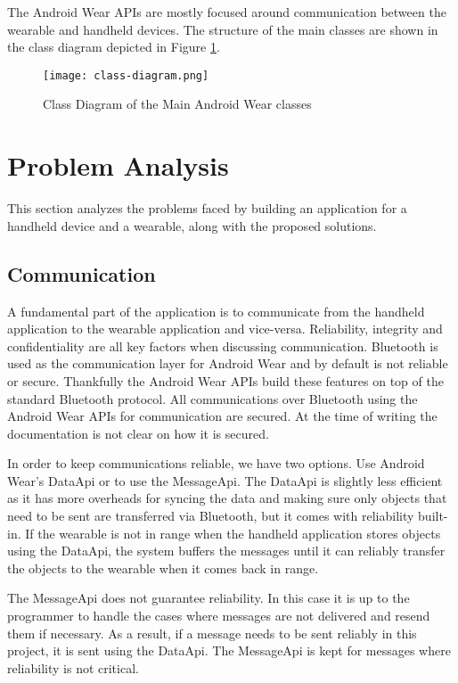 The Android Wear APIs are mostly focused around communication between the
wearable and handheld devices. The structure of the main classes are shown in
the class diagram depicted in Figure \ref{fig:android_wear_class_diagram}.

\begin{figure}
    \centering
    \texttt{[image: class-diagram.png]}
    \caption{Class Diagram of the Main Android Wear classes}
    \label{fig:android_wear_class_diagram}
\end{figure}

\section{Problem Analysis}

This section analyzes the problems faced by building an application for a
handheld device and a wearable, along with the proposed solutions.

\subsection{Communication}

A fundamental part of the application is to communicate from the handheld
application to the wearable application and vice-versa. Reliability, integrity
and confidentiality are all key factors when discussing communication. Bluetooth
is used as the communication layer for Android Wear and by default is not
reliable or secure. Thankfully the Android Wear APIs build these features on top
of the standard Bluetooth protocol. All communications over Bluetooth using the
Android Wear APIs for communication are secured. At the time of writing the
documentation is not clear on how it is secured.

In order to keep communications reliable, we have two options. Use Android
Wear's DataApi or to use the MessageApi. The DataApi is slightly less efficient
as it has more overheads for syncing the data and making sure only objects that
need to be sent are transferred via Bluetooth, but it comes with reliability
built-in. If the wearable is not in range when the handheld application stores
objects using the DataApi, the system buffers the messages until it can reliably
transfer the objects to the wearable when it comes back in range.

The MessageApi does not guarantee reliability. In this case it is up to the
programmer to handle the cases where messages are not delivered and resend them
if necessary. As a result, if a message needs to be sent reliably in this
project, it is sent using the DataApi. The MessageApi is kept for messages where
reliability is not critical.


